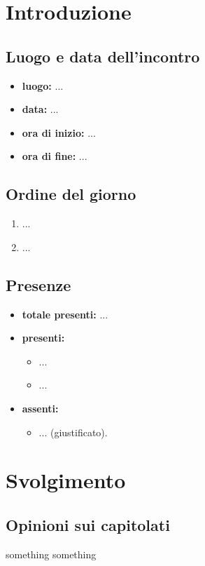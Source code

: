 \section{Introduzione}

\subsection{Luogo e data dell'incontro}
	\begin{itemize}
		\item \textbf{luogo:} ...
		\item \textbf{data:} ...
		\item \textbf{ora di inizio:} ...
		\item \textbf{ora di fine:} ...
	\end{itemize}

\subsection{Ordine del giorno}
	\begin{enumerate}

		\item ...
		\item ...

	\end{enumerate}

\subsection{Presenze}
	\begin{itemize}
		\item \textbf{totale presenti:} ...
		\item \textbf{presenti: }
			\begin{itemize}			
				\item ...
				\item ...
			\end{itemize}
		\item \textbf{assenti: } 
			\begin{itemize}	
				\item ... (giustificato).
			\end{itemize}
	\end{itemize}


\newpage
\section{Svolgimento}

\subsection{Opinioni sui capitolati}
something
\newline
something
